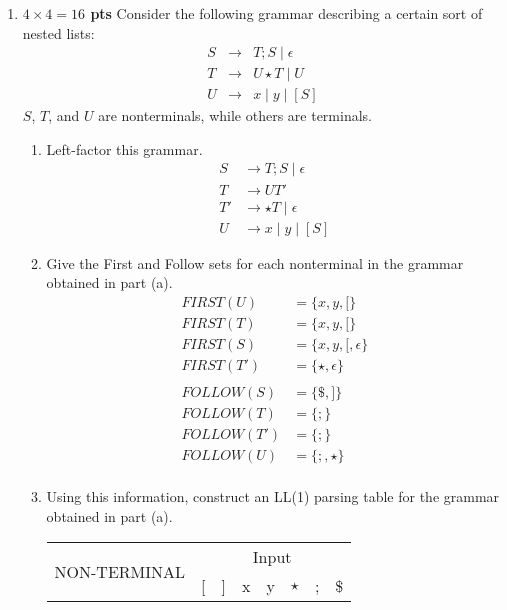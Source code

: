 \documentclass[10pt]{article}
\newcommand {\pts}[1]{{\bf #1 pts}}
\begin{document}
\begin{enumerate}
\newpage
\item \pts{$4\times 4 =16$} Consider the following grammar describing a certain sort of nested lists:
\[\begin{array}{cll}
S & \rightarrow & T;S \mid \epsilon \\
T & \rightarrow & U\star T \mid U \\
U & \rightarrow & x\mid y\mid [S]
\end{array}\]
$S$, $T$, and $U$ are nonterminals, while others are terminals.
\begin{enumerate}
    \item Left-factor this grammar.
        \begin{align*}
            S   &\rightarrow T;S \mid \epsilon      \\
            T   &\rightarrow UT'                    \\
            T'  &\rightarrow \star T \mid \epsilon  \\
            U   &\rightarrow x\mid y\mid [S]
        \end{align*}
    \item Give the First and Follow sets for each nonterminal in the grammar obtained in part (a).
        \begin{align*}
            FIRST(U)    &= \{x, y, [\}          \\
            FIRST(T)    &= \{x, y, [\}          \\
            FIRST(S)    &= \{x, y, [, \epsilon\}\\
            FIRST(T')   &= \{\star, \epsilon\}  \\
            \\
            FOLLOW(S)   &= \{\$, ]\}    \\
            FOLLOW(T)   &= \{;\}        \\
            FOLLOW(T')  &= \{;\}        \\
            FOLLOW(U)   &= \{;, \star\}  \\
        \end{align*}
    \item Using this information, construct an LL(1) parsing table for the grammar obtained in part (a).
    \begin{table}[h!]
    \centering
      \begin{tabular}{|c|c|c|c|c|c|c|c|}
          \hline
          \multirow{2}{6em}{NON-TERMINAL}
                              & \multicolumn{7}{|c|}{Input} \\
          \cline{2-8}         & [ & ] & x & y & $\star$ & ; & \$  \\ \hline

\end{tabular}
\end{table}
\end{enumerate}
\end{enumerate}
\end{document}
